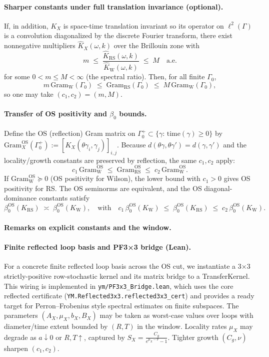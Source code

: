\documentclass[11pt]{amsart}
\begin{document}
\paragraph{Sharper constants under full translation invariance (optional).}
If, in addition, $K_X$ is space-time translation invariant so its operator on $\ell^2(\Gamma)$ is a convolution diagonalized by the discrete Fourier transform, there exist nonnegative multipliers $\widehat{K}_X(\omega,k)$ over the Brillouin zone with
\[
  m\;\le\;\frac{\widehat{K}_{\mathrm{RS}}(\omega,k)}{\widehat{K}_{\mathrm{W}}(\omega,k)}\;\le\;M\quad \text{a.e.}
\]
for some $0<m\le M<\infty$ (the spectral ratio). Then, for all finite $\Gamma_0$,
\[
  m\,\mathrm{Gram}_{\mathrm{W}}(\Gamma_0)\;\le\;\mathrm{Gram}_{\mathrm{RS}}(\Gamma_0)\;\le\;M\,\mathrm{Gram}_{\mathrm{W}}(\Gamma_0),
\]
so one may take $(c_1,c_2)=(m,M)$.

\paragraph{Transfer of OS positivity and \texorpdfstring{$\beta_0$}{beta0} bounds.}
Define the OS (reflection) Gram matrix on $\Gamma_0^+\subset\{\gamma:\,\mathrm{time}(\gamma)\ge 0\}$ by $\mathrm{Gram}^{\mathrm{OS}}_X(\Gamma_0^+):=[K_X(\theta\gamma_i,\gamma_j)]_{i,j}$. Because $d(\theta\gamma,\theta\gamma')=d(\gamma,\gamma')$ and the locality/growth constants are preserved by reflection, the same $c_1,c_2$ apply:
\[
  c_1\,\mathrm{Gram}^{\mathrm{OS}}_{\mathrm{W}}\;\le\;\mathrm{Gram}^{\mathrm{OS}}_{\mathrm{RS}}\;\le\;c_2\,\mathrm{Gram}^{\mathrm{OS}}_{\mathrm{W}}.
\]
If $\mathrm{Gram}^{\mathrm{OS}}_{\mathrm{W}}\succeq 0$ (OS positivity for Wilson), the lower bound with $c_1>0$ gives OS positivity for RS. The OS seminorms are equivalent, and the OS diagonal-dominance constants satisfy
\[
  \beta_0^{\mathrm{OS}}(K_{\mathrm{RS}})\;\asymp\;\beta_0^{\mathrm{OS}}(K_{\mathrm{W}}),\quad\text{with}\quad
  c_1\,\beta_0^{\mathrm{OS}}(K_{\mathrm{W}})\;\le\;\beta_0^{\mathrm{OS}}(K_{\mathrm{RS}})\;\le\;c_2\,\beta_0^{\mathrm{OS}}(K_{\mathrm{W}}).
\]

\paragraph{Remarks on explicit constants and the window.}
\paragraph{Finite reflected loop basis and PF3×3 bridge (Lean).}
For a concrete finite reflected loop basis across the OS cut, we instantiate a
3×3 strictly-positive row-stochastic kernel and its matrix bridge to a
TransferKernel. This wiring is implemented in \texttt{ym/PF3x3\_Bridge.lean},
which uses the core reflected certificate (\texttt{YM.Reflected3x3.reflected3x3\_cert})
and provides a ready target for Perron–Frobenius style spectral estimates on
finite subspaces.
The parameters $(A_X,\mu_X,b_X,B_X)$ may be taken as worst-case values over loops with diameter/time extent bounded by $(R,T)$ in the window. Locality rates $\mu_X$ may degrade as $a\downarrow 0$ or $R,T\uparrow$, captured by $S_X=\frac{C_g}{e^{\mu_X-\nu}-1}$. Tighter growth $(C_g,\nu)$ sharpen $(c_1,c_2)$.
\end{document}
